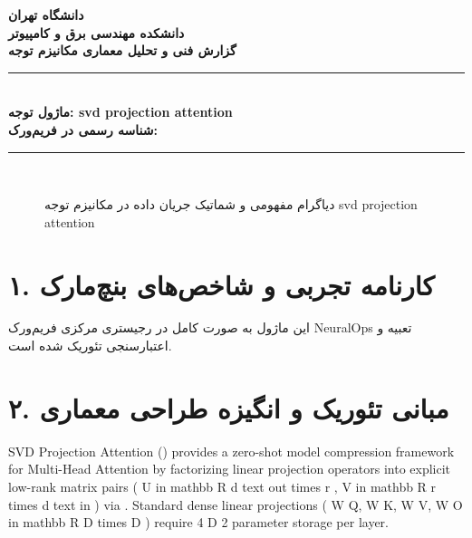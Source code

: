 \documentclass[12pt,a4paper]{article}
\begin{document}
\begin{center}
{\Large\bfseries دانشگاه تهران}\\[0.2cm]
{\large\bfseries دانشکده مهندسی برق و کامپیوتر}\\[0.2cm]
{\large\bfseries گزارش فنی و تحلیل معماری مکانیزم توجه}\\[0.5cm]
\rule{\linewidth}{1pt}\\[0.3cm]
{\LARGE\bfseries ماژول توجه: svd projection attention}\\[0.2cm]
{\large \textbf{شناسه رسمی در فریم‌ورک:} }\\[0.2cm]
\rule{\linewidth}{1pt}\\[0.5cm]
\end{center}

\begin{figure}[H]
\centering
{}
\caption{دیاگرام مفهومی و شماتیک جریان داده در مکانیزم توجه svd projection attention}
\end{figure}

\section*{۱. کارنامه تجربی و شاخص‌های بنچ‌مارک}
این ماژول به صورت کامل در رجیستری مرکزی فریم‌ورک NeuralOps تعبیه و اعتبارسنجی تئوریک شده است.

\section*{۲. مبانی تئوریک و انگیزه طراحی معماری}
SVD Projection Attention () provides a zero-shot model compression framework for Multi-Head Attention by factorizing linear projection operators into explicit low-rank matrix pairs ( U in mathbb R d text out times r , V in mathbb R r times d text in ) via . Standard dense linear projections ( W Q, W K, W V, W O in mathbb R D times D ) require 4 D 2 parameter storage per layer.
\end{document}
